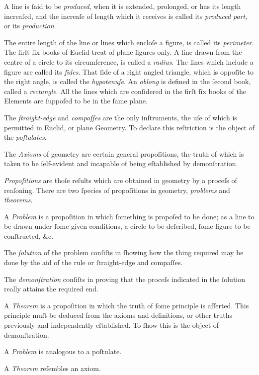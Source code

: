 A line is ſaid to be \textit{produced}, when it is extended, prolonged, or has its length increaſed, and the increaſe of length which it receives is called its \textit{produced part}, or its \textit{production}.

The entire length of the line or lines which encloſe a figure, is called its \textit{perimeter}. The firſt ſix books of Euclid treat of plane figures only. A line drawn from the centre of a circle to its circumference, is called a \textit{radius}. The lines which include a figure are called its \textit{ſides}. That ſide of a right angled triangle, which is oppoſite to the right angle, is called the \textit{hypotenuſe}. An \textit{oblong} is defined in the ſecond book, called a \textit{rectangle}. All the lines which are conſidered in the firſt ſix books of the Elements are ſuppoſed to be in the ſame plane.

The \textit{ſtraight-edge} and \textit{compaſſes} are the only inſtruments, the uſe of which is permitted in Euclid, or plane Geometry. To declare this reſtriction is the object of the \textit{poſtulates}.

The \textit{Axioms} of geometry are certain general propoſitions, the truth of which is taken to be ſelf-evident and incapable of being eſtablished by demonſtration.

\textit{Propoſitions} are thoſe reſults which are obtained in geometry by a proceſs of reaſoning. There are two ſpecies of propoſitions in geometry, \textit{problems} and \textit{theorems}.

A \textit{Problem} is a propoſition in which ſomething is propoſed to be done; as a line to be drawn under ſome given conditions, a circle to be deſcribed, ſome figure to be conſtructed, \&c.

The \textit{ſolution} of the problem conſiſts in ſhowing how the thing required may be done by the aid of the rule or ſtraight-edge and compaſſes.

The \textit{demonſtration} conſiſts in proving that the proceſs indicated in the ſolution really attains the required end.

A \textit{Theorem} is a propoſition in which the truth of ſome principle is aſſerted. This principle muſt be deduced from the axioms and definitions, or other truths previously and independently eſtablished. To ſhow this is the object of demonſtration.

A \textit{Problem} is analogous to a poſtulate.

A \textit{Theorem} reſembles an axiom.

